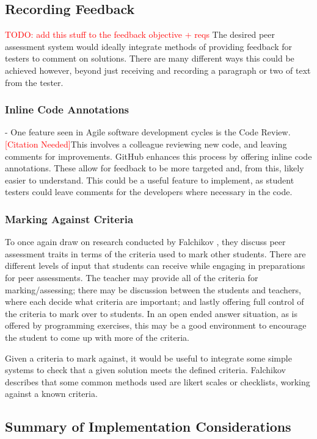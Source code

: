 \documentclass[a4paper,11pt]{report}
\newcommand{\cn}{\textcolor{red}{[Citation Needed]}}
\newcommand{\todo}[1]{\textcolor{red}{TODO: #1}}
\begin{document}
\subsection{Recording Feedback}
\todo{add this stuff to the feedback objective + reqs}
The desired peer assessment system would ideally integrate methods of providing feedback for testers to comment on solutions. There are many different ways this could be achieved however, beyond just receiving and recording a paragraph or two of text from the tester.\par
\subsubsection*{Inline Code Annotations} - One feature seen in Agile software development cycles is the Code Review.\cn This involves a colleague reviewing new code, and leaving comments for improvements. GitHub enhances this process by offering inline code annotations. These allow for feedback to be more targeted and, from this, likely easier to understand. This could be a useful feature to implement, as student testers could leave comments for the developers where necessary in the code.
\subsubsection*{Marking Against Criteria} 
To once again draw on research conducted by Falchikov \cite{falchikov_improving_2013}, they discuss peer assessment traits in terms of the criteria used to mark other students. There are different levels of input that students can receive while engaging in preparations for peer assessments. The teacher may provide all of the criteria for marking/assessing; there may be discussion between the students and teachers, where each decide what criteria are important; and lastly offering full control of the criteria to mark over to students. In an open ended answer situation, as is offered by programming exercises, this may be a good environment to encourage the student to come up with more of the criteria.\par
Given a criteria to mark against, it would be useful to integrate some simple systems to check that a given solution meets the defined criteria. Falchikov describes that some common methods used are likert scales or checklists, working against a known criteria.\par

\subsection{Summary of Implementation Considerations}
\end{document}
